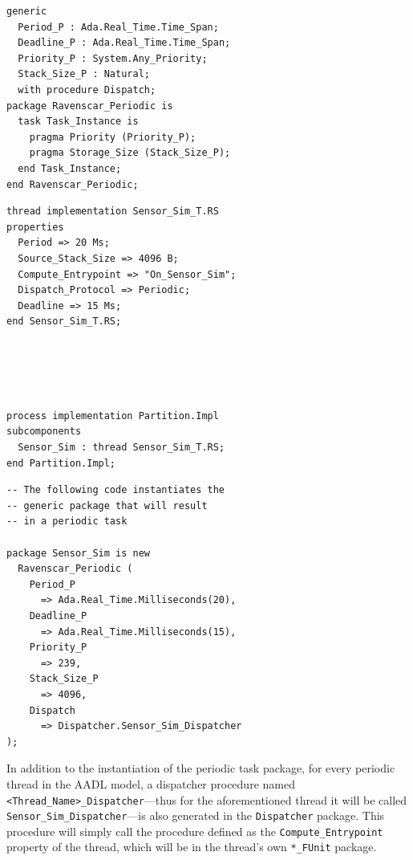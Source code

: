 \begin{minipage}{\listingwidth}
\flushleft
\lstset{language=ada}
\begin{lstlisting}[label=lst:ravenscar_periodic, caption=The
    \texttt{Ravenscar\_Periodic} generic package specification.]
generic
  Period_P : Ada.Real_Time.Time_Span;
  Deadline_P : Ada.Real_Time.Time_Span;
  Priority_P : System.Any_Priority;
  Stack_Size_P : Natural;
  with procedure Dispatch;
package Ravenscar_Periodic is
  task Task_Instance is
    pragma Priority (Priority_P);
    pragma Storage_Size (Stack_Size_P);
  end Task_Instance;
end Ravenscar_Periodic;
\end{lstlisting}
\end{minipage}

\begin{minipage}{0.45\linewidth}
\lstset{language=aadl}
\begin{lstlisting}[label=lst:aadl_periodic, caption=AADL periodic thread.]
thread implementation Sensor_Sim_T.RS
properties
  Period => 20 Ms;
  Source_Stack_Size => 4096 B;
  Compute_Entrypoint => "On_Sensor_Sim";
  Dispatch_Protocol => Periodic;
  Deadline => 15 Ms;
end Sensor_Sim_T.RS;





process implementation Partition.Impl
subcomponents
  Sensor_Sim : thread Sensor_Sim_T.RS;
end Partition.Impl;
\end{lstlisting}
\end{minipage}
\hspace{5mm}
\begin{minipage}{0.45\linewidth}
\lstset{language=ada}
\begin{lstlisting}[label=lst:ada_periodic, caption=Thread
    transformed to Ada task.]
-- The following code instantiates the
-- generic package that will result
-- in a periodic task

package Sensor_Sim is new 
  Ravenscar_Periodic (
    Period_P
      => Ada.Real_Time.Milliseconds(20),
    Deadline_P
      => Ada.Real_Time.Milliseconds(15),
    Priority_P
      => 239,  
    Stack_Size_P
      => 4096, 
    Dispatch
      => Dispatcher.Sensor_Sim_Dispatcher
);
\end{lstlisting}
\end{minipage}

In addition to the instantiation of the periodic task package, for
every periodic thread in the AADL model, a dispatcher procedure named
\texttt{<Thread\_Name>\_Dispatcher}---thus for the aforementioned
thread it will be called \texttt{Sensor\_Sim\_Dispatcher}---is also
generated in the \texttt{Dispatcher} package. This procedure will
simply call the procedure defined as the \texttt{Compute\_Entrypoint}
property of the thread, which will be in the thread's own
\texttt{*\_FUnit} package.

